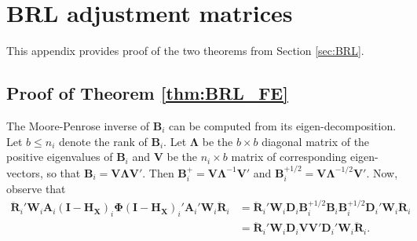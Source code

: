 \documentclass[12pt]{article}\usepackage[]{graphicx}\usepackage[]{color}
\newcommand{\bm}{\mathbf}
\newcommand{\bs}{\boldsymbol}
\begin{document}
\appendix

\section{BRL adjustment matrices}
\label{app:theorems}

This appendix provides proof of the two theorems from Section \ref{sec:BRL}. 

\subsection{Proof of Theorem \ref{thm:BRL_FE}}

The Moore-Penrose inverse of $\bm{B}_i$ can be computed from its eigen-decomposition. Let $b \leq n_i$ denote the rank of $\bm{B}_i$. 
Let $\bs\Lambda$ be the $b \times b$ diagonal matrix of the positive eigenvalues of $\bm{B}_i$ and $\bm{V}$ be the $n_i \times b$ matrix of corresponding eigen-vectors, so that $\bm{B}_i = \bm{V}\bs\Lambda\bm{V}'$. 
Then $\bm{B}_i^+ = \bm{V}\bs\Lambda^{-1}\bm{V}'$ and $\bm{B}_i^{+1/2} = \bm{V}\bs\Lambda^{-1/2}\bm{V}'$. Now, observe that 
\begin{align}
\label{eq:step1}
\bm{\ddot{R}}_i' \bm{W}_i \bm{A}_i \left(\bm{I} - \bm{H_X}\right)_i \bs\Phi \left(\bm{I} - \bm{H_X}\right)_i' \bm{A}_i' \bm{W}_i \bm{\ddot{R}}_i &= \bm{\ddot{R}}_i' \bm{W}_i \bm{D}_i \bm{B}_i^{+1/2} \bm{B}_i \bm{B}_i^{+1/2} \bm{D}_i' \bm{W}_i \bm{\ddot{R}}_i \nonumber \\
&= \bm{\ddot{R}}_i' \bm{W}_i \bm{D}_i \bm{V}\bm{V}' \bm{D}_i' \bm{W}_i \bm{\ddot{R}}_i. 
\end{align}
\end{document}
